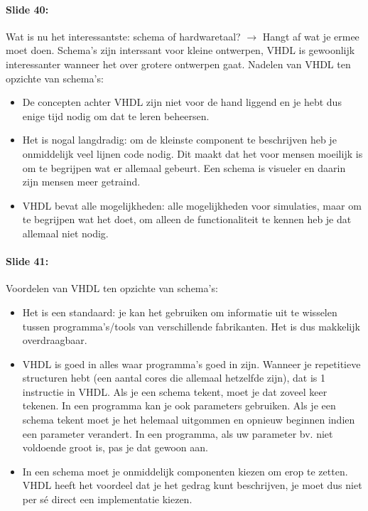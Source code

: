 \documentclass[10pt,a4paper]{book}
\begin{document}
\paragraph{Slide 40:} Wat is nu het interessantste: schema of hardwaretaal? $\rightarrow$ Hangt af wat je ermee moet doen. Schema's zijn interssant voor kleine ontwerpen, VHDL is gewoonlijk interessanter wanneer het over grotere ontwerpen gaat.
Nadelen van VHDL ten opzichte van schema's: 
\begin{itemize}
\item De concepten achter VHDL zijn niet voor de hand liggend en je hebt dus enige tijd nodig om dat te leren beheersen. 
\item Het is nogal langdradig: om de kleinste component te beschrijven heb je onmiddelijk veel lijnen code nodig. Dit maakt dat het voor mensen moeilijk is om te begrijpen wat er allemaal gebeurt. Een schema is visueler en daarin zijn mensen meer getraind.
\item VHDL bevat alle mogelijkheden: alle mogelijkheden voor simulaties, maar om te begrijpen wat het doet, om alleen de functionaliteit te kennen heb je dat allemaal niet nodig.
\end{itemize}

\paragraph{Slide 41:} Voordelen van VHDL ten opzichte van schema's:
\begin{itemize} 
\item Het is een standaard: je kan het gebruiken om informatie uit te wisselen tussen programma's/tools van verschillende fabrikanten. Het is dus makkelijk overdraagbaar.
\item VHDL is goed in alles waar programma's goed in zijn. Wanneer je repetitieve structuren hebt (een aantal cores die allemaal hetzelfde zijn), dat is 1 instructie in VHDL. Als je een schema tekent, moet je dat zoveel keer tekenen. In een programma kan je ook parameters gebruiken. Als je een schema tekent moet je het helemaal uitgommen en opnieuw beginnen indien een parameter verandert. In een programma, als uw parameter bv. niet voldoende groot is, pas je dat gewoon aan.
\item In een schema moet je onmiddelijk componenten kiezen om erop te zetten. VHDL heeft het voordeel dat je het gedrag kunt beschrijven, je moet dus niet per s\'e direct een implementatie kiezen.
\end{itemize}
\end{document}
